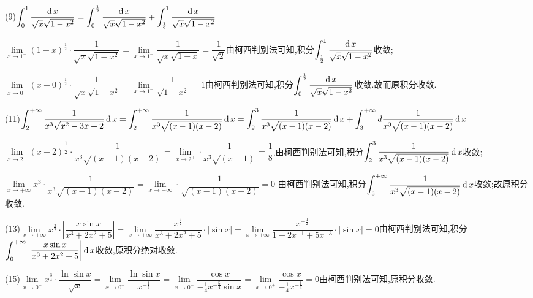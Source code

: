 (9)$\displaystyle\int_0^1 {\dfrac{{\operatorname{\mathop{}\!\mathrm{d}} x}}{{\sqrt x \sqrt {1 - {x^2}} }}}  = \displaystyle\int_0^{\frac{1}{2}} {\dfrac{{\operatorname{\mathop{}\!\mathrm{d}} x}}{{\sqrt x \sqrt {1 - {x^2}} }}}  + \displaystyle\int_{\frac{1}{2}}^1 {\dfrac{{\operatorname{\mathop{}\!\mathrm{d}} x}}{{\sqrt x \sqrt {1 - {x^2}} }}} $

$\lim\limits_{x \to 1^-} {(1 - x)^{\frac{1}{2}}} \cdot \dfrac{1}{{\sqrt x \sqrt {1 - {x^2}} }} = \lim\limits_{x \to 1^-} \dfrac{1}{{\sqrt x \sqrt {1 + x} }} = \dfrac{1}{{\sqrt 2 }}$由柯西判别法可知,积分$\displaystyle\int_{\frac{1}{2}}^1 {\dfrac{{\operatorname{\mathop{}\!\mathrm{d}} x}}{{\sqrt x \sqrt {1 - {x^2}} }}} $收敛;

$\lim\limits_{x \to 0^+} {(x - 0)^{\frac{1}{2}}} \cdot \dfrac{1}{{\sqrt x \sqrt {1 - {x^2}} }} = \lim\limits_{x \to 1^-} \dfrac{1}{{\sqrt {1 - {x^2}} }} = 1$由柯西判别法可知,积分$\displaystyle\int_0^{\frac{1}{2}} {\dfrac{{\operatorname{\mathop{}\!\mathrm{d}} x}}{{\sqrt x \sqrt {1 - {x^2}} }}} $收敛.故而原积分收敛.

(11)$\displaystyle\int_2^{ + \infty } {\dfrac{1}{{{x^3}\sqrt {{x^2} - 3x + 2} }}\operatorname{\mathop{}\!\mathrm{d}} x}  = \displaystyle\int_2^{ + \infty } {\dfrac{1}{{{x^3}\sqrt {(x - 1)(x - 2)} }}\operatorname{\mathop{}\!\mathrm{d}} x}  = \displaystyle\int_2^3 {\dfrac{1}{{{x^3}\sqrt {(x - 1)(x - 2)} }}\operatorname{\mathop{}\!\mathrm{d}} x}  + \displaystyle\int_3^{ + \infty } {d\frac{1}{{{x^3}\sqrt {(x - 1)(x - 2)} }}\operatorname{\mathop{}\!\mathrm{d}} x} $

$\mathop {\lim }\limits_{x \to {2^ + }} {(x - 2)^{\dfrac{1}{2}}} \cdot \dfrac{1}{{{x^3}\sqrt {(x - 1)(x - 2)} }} = \mathop {\lim }\limits_{x \to {2^ + }}  \cdot \dfrac{1}{{{x^3}\sqrt {(x - 1)} }} = \dfrac{1}{8}$,由柯西判别法可知,积分$\displaystyle\int_2^3 {\dfrac{1}{{{x^3}\sqrt {(x - 1)(x - 2)} }}\operatorname{\mathop{}\!\mathrm{d}} x} $收敛;

$\lim\limits_{x \to +\infty} {x^3} \cdot \dfrac{1}{{{x^3}\sqrt {(x - 1)(x - 2)} }} = \lim\limits_{x \to +\infty}  \cdot \dfrac{1}{{\sqrt {(x - 1)(x - 2)} }} = 0$
由柯西判别法可知,积分$\displaystyle\int_3^{ + \infty } {\dfrac{1}{{{x^3}\sqrt {(x - 1)(x - 2)} }}\operatorname{\mathop{}\!\mathrm{d}} x} $收敛;故原积分收敛.

(13)$\lim\limits_{x \to +\infty} {x^{\frac{3}{2}}} \cdot \left| {\dfrac{{x\sin x}}{{{x^3} + 2{x^2} + 5}}} \right| = \lim\limits_{x \to +\infty} \dfrac{{{x^{\frac{5}{2}}}}}{{{x^3} + 2{x^2} + 5}} \cdot \left| {\sin x} \right| = \lim\limits_{x \to +\infty} \dfrac{{{x^{ - \frac{1}{2}}}}}{{1 + 2{x^{ - 1}} + 5{x^{ - 3}}}} \cdot \left| {\sin x} \right| = 0$由柯西判别法可知,积分$\displaystyle\int_0^{ + \infty } {\left| {\dfrac{{x\sin x}}{{{x^3} + 2{x^2} + 5}}} \right|\operatorname{\mathop{}\!\mathrm{d}} x} $收敛,原积分绝对收敛.

(15)$\lim\limits_{x \to 0^+} {x^{\frac{3}{4}}} \cdot \dfrac{{\ln \sin x}}{{\sqrt x }} = \lim\limits_{x \to 0^+} \dfrac{{\ln \sin x}}{{{x^{ - \frac{1}{4}}}}} = \lim\limits_{x \to 0^+} \dfrac{{\cos x}}{{ - \frac{1}{4}{x^{ - \frac{5}{4}}}\sin x}} = \lim\limits_{x \to 0^+} \dfrac{{\cos x}}{{ - \frac{1}{4}{x^{ - \frac{1}{4}}}}} = 0$由柯西判别法可知,原积分收敛.

